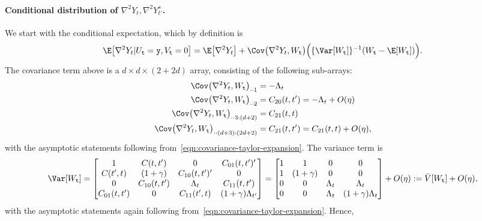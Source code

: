 \documentclass{article}
\begin{document}
	\paragraph{Conditional distribution of $\nabla^2 Y_t,\nabla^2 Y_{t'}^s$.}
	We start with the conditional expectation, which by definition is 
	\begin{equation*}
		\E\big[\nabla^2 Y_t|U_{\tt t} = {\tt y}, V_{\tt t} = 0\big] = \E\big[\nabla^2 Y_t\big] + \Cov\big(\nabla^2 Y_t,W_{\tt t}\big) \Big(\{\Var[W_{\tt t}]\}^{-1}(W_{{\tt t}}  -\E[W_{{\tt t}}])\Big).
	\end{equation*}
	The covariance term above is a $d \times d \times (2 + 2d)$ array, consisting of the following sub-arrays:
	\begin{align*}
		\Cov\big(\nabla^2 Y_t,W_{\tt t}\big)_{\cdot \cdot 1} & = -\Lambda_t \\
		\Cov\big(\nabla^2 Y_t,W_{\tt t}\big)_{\cdot \cdot 2} & = C_{20}(t,t') = -\Lambda_t + O(\eta) \\
		\Cov\big(\nabla^2 Y_t,W_{\tt t}\big)_{\cdot \cdot 3:(d + 2)} & = C_{21}(t,t) \\
		\Cov\big(\nabla^2 Y_t,W_{\tt t}\big)_{\cdot \cdot (d + 3):(2d + 2)} & = C_{21}(t,t') = C_{21}(t,t) + O(\eta),	
	\end{align*}
	with the asymptotic statements following from~\eqref{eqn:covariance-taylor-expansion}. The variance term is 
	\begin{equation*}
		\Var[W_{\tt t}] 
		= 
		\begin{bmatrix}
			1 & C(t,t') & 0 & C_{01}(t,t')' \\
			C(t',t) & (1 + \gamma) & C_{10}(t,t')' & 0 \\
			0 & C_{10}(t,t') & \Lambda_t & C_{11}(t,t') \\
			C_{01}(t,t') & 0 & C_{11}(t',t) & (1 + \gamma) \Lambda_{t'}
		\end{bmatrix}
		= 
		\begin{bmatrix}
			1 & 1 & 0 & 0 \\
			1 & (1 + \gamma) & 0 & 0 \\
			0 & 0 & \Lambda_t & \Lambda_{t} \\
			0 & 0 & \Lambda_t & (1 + \gamma) \Lambda_{t}
		\end{bmatrix}
		+ O(\eta) 
		:= \bar{V}[W_{{\tt t}}] + O(\eta),
	\end{equation*}
	with the asymptotic statements again following from~\eqref{eqn:covariance-taylor-expansion}. Hence,
\end{document}
